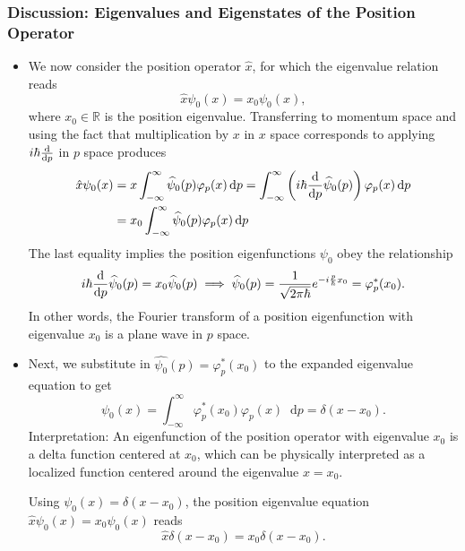 \documentclass[11pt, a4paper]{article}
\newcommand{\diff}{\mathop{}\!\mathrm{d}} %
\newcommand{\F}[1]{\widehat{#1}} %
\begin{document}
\subsubsection{Discussion: Eigenvalues and Eigenstates of the Position Operator}
\begin{itemize}
    \item We now consider the position operator $ \hat{x} $, for which the eigenvalue relation reads
    \begin{equation*}
        \hat{x}\psi_{0}(x) = x_{0} \psi_{0}(x),
    \end{equation*}
    where $ x_{0} \in \mathbb{R} $ is the position eigenvalue. Transferring to momentum space and using the fact that multiplication by $ x $ in $ x $ space corresponds to applying $ i \hbar \dv{p} $ in $ p $ space produces
    \begin{align*}
        \hat{x} \psi_{0}(x) & = x \int_{-\infty}^{\infty}\F{\psi}_{0}(p)\varphi_{p}(x)\diff p = \int_{-\infty}^{\infty} \left( i \hbar \dv{p}\F{\psi}_{0}(p) \right)\varphi_{p}(x) \diff p \\ & = x_{0} \int_{-\infty}^{\infty}\F{\psi}_{0}(p)\varphi_{p}(x)\diff p 
    \end{align*}
    The last equality implies the position eigenfunctions $ \psi_{0} $ obey the relationship
    \begin{equation*}
        i \hbar \dv{p} \F{\psi}_{0}(p) = x_{0} \F{\psi}_{0}(p) \implies \F{\psi}_{0}(p) = \frac{1}{\sqrt{2\pi \hbar}} e^{-i \frac{p}{\hbar}x_{0}} = \varphi_{p}^{*}(x_{0}).
    \end{equation*}
    In other words, the Fourier transform of a position eigenfunction with eigenvalue $ x_{0} $ is a plane wave in $ p $ space.

    \item Next, we substitute in $ \F{\psi_{0}}(p) = \varphi_{p}^{*}(x_{0}) $ to the expanded eigenvalue equation to get
    \begin{equation*}
        \psi_{0}(x) = \int_{-\infty}^{\infty}\varphi_{p}^{*}(x_{0}) \varphi_{p}(x) \diff p = \delta(x - x_{0}).
    \end{equation*}
    Interpretation: An eigenfunction of the position operator with eigenvalue $ x_{0} $ is a delta function centered at $ x_{0} $, which can be physically interpreted as a localized function centered around the eigenvalue $ x = x_{0} $.

    Using $ \psi_{0}(x) = \delta(x - x_{0}) $, the position eigenvalue equation $ \hat{x}\psi_{0}(x) = x_{0} \psi_{0}(x) $ reads
    \begin{equation*}
        \hat{x} \delta(x - x_{0}) = x_{0} \delta(x - x_{0}).
    \end{equation*}
    
\end{itemize}
\end{document}
